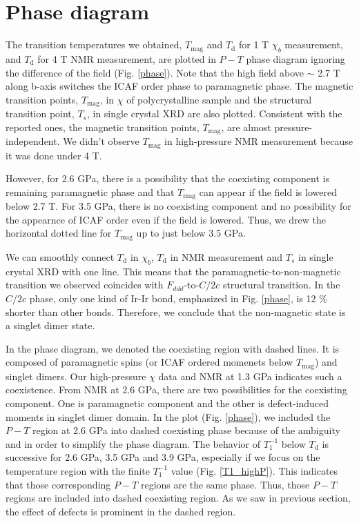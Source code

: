 \documentclass[a4,10.5pt]{report}
\begin{document}
\newpage
\section{Phase diagram}
The transition temperatures we obtained, $T_{\mathrm{mag}}$ and $T_\mathrm{d}$ for 1 T $\chi_b$ measurement, and $T_\mathrm{d}$ for 4 T NMR measurement, 
are plotted in $P-T$ phase diagram ignoring the difference of the field (Fig. \ref{phase}). 
Note that the high field above $\sim$ 2.7 T along b-axis switches the ICAF order phase to paramagnetic phase. 
The magnetic transition points, $T_{\mathrm{mag}}$, in $\chi$ of polycrystalline sample \cite{Majumder2018} 
and the structural transition point, $T_s$, in single crystal XRD \cite{veiga2017pressure} are also plotted. 
Consistent with the reported ones, the magnetic transition points, $T_{\mathrm{mag}}$, are almost pressure-independent. 
We didn't observe $T_{\mathrm{mag}}$ in high-pressure NMR measurement because it was done under 4 T. 
\begin{comment}
However, the coexisting component at 1.3 GPa is paramagnetic one. 
It implies that, at least at 1.3 GPa, $T_{\mathrm{mag}}$ should appear if the field is lowered below 2.7 T because the paramagnetic phase should become ICAF order moments below 2.7 T. 
\end{comment}
However, for 2.6 GPa, there is a possibility that the coexisting component is remaining paramagnetic phase and that $T_{\mathrm{mag}}$ can appear if the field is lowered below 2.7 T. 
For 3.5 GPa, there is no coexisting component and no possibility for the appearnce of ICAF order even if the field is lowered. 
Thus, we drew the horizontal dotted line for $T_{\mathrm{mag}}$ up to just below 3.5 GPa. 

We can smoothly connect $T_\mathrm{d}$ in $\chi_b$, $T_\mathrm{d}$ in NMR measurement and $T_s$ in single crystal XRD with one line. 
This means that the paramagnetic-to-non-magnetic transition we observed coincides with $F_{ddd}$-to-$C/2c$ structural transition. 
In the $C/2c$ phase, only one kind of Ir-Ir bond, emphasized in Fig. \ref{phase}, is 12 \% shorter than other bonds. 
Therefore, we conclude that the non-magnetic state is a singlet dimer state.

In the phase diagram, we denoted the coexisting region with dashed lines. 
It is composed of paramagnetic spins (or ICAF ordered momenets below $T_\mathrm{mag}$) and singlet dimers.
Our high-pressure $\chi$ data and NMR at 1.3 GPa indicates such a coexistence.
From NMR at 2.6 GPa, there are two possibilities for the coexisting component.
One is paramagnetic component and  the other is defect-induced moments in singlet dimer domain.
In the plot (Fig. \ref{phase}), we included the $P-T$ region at 2.6 GPa into dashed coexisting phase because of the ambiguity and in order to simplify the phase diagram.
The behavior of $T^{-1}_1$ below $T_\mathrm{d}$ is successive for 2.6 GPa, 3.5 GPa and 3.9 GPa, especially if we focus on the temperature region with the finite $T^{-1}_1$ value
(Fig. \ref{T1_highP}).
This indicates that those corresponding $P-T$ regions are the same phase.
Thus, those $P-T$ regions are included into dashed coexisting region.
As we saw in previous section, the effect of defects is prominent in the dashed region. 
\end{document}
